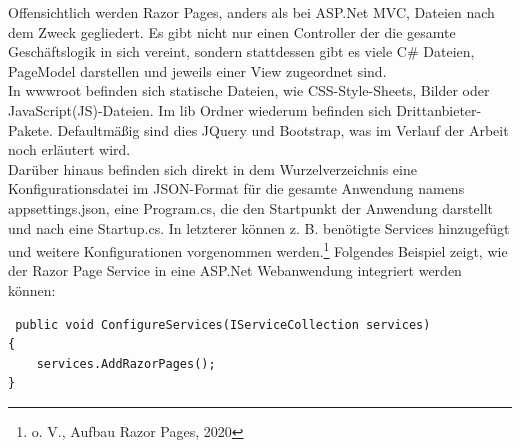 \documentclass[a4paper,
12pt,
oneside]
{article}
\begin{document}
	Offensichtlich werden Razor Pages, anders als bei ASP.Net MVC, Dateien nach dem Zweck gegliedert. Es gibt nicht nur einen Controller der die gesamte Geschäftslogik in sich vereint, sondern stattdessen gibt es viele C\# Dateien, PageModel darstellen und jeweils einer View zugeordnet sind. \\
	In wwwroot befinden sich statische Dateien, wie CSS-Style-Sheets, Bilder oder JavaScript(JS)-Dateien. Im lib Ordner wiederum befinden sich Drittanbieter-Pakete. Defaultmäßig sind dies JQuery und Bootstrap, was im Verlauf der Arbeit noch erläutert wird. \\
	Darüber hinaus befinden sich direkt in dem Wurzelverzeichnis eine Konfigurationsdatei im JSON-Format für die gesamte Anwendung namens \glqq appsettings.json\grqq, eine \glqq Program.cs\grqq, die den Startpunkt der Anwendung darstellt und nach eine \glqq Startup.cs\grqq. In letzterer können z. B. benötigte Services hinzugefügt und weitere Konfigurationen vorgenommen werden.\footnote{o. V., Aufbau Razor Pages, 2020} Folgendes Beispiel zeigt, wie der Razor Page Service in eine ASP.Net Webanwendung integriert werden können:
	\lstset{style=csharp}
	\begin{lstlisting}
 public void ConfigureServices(IServiceCollection services)
{
	services.AddRazorPages();
}
	\end{lstlisting}
	
\end{document}
